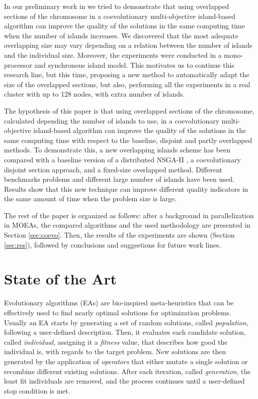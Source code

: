 \documentclass[preprint]{elsarticle}
\begin{document}
In our preliminary work in \citep{Garcia16hpmoon} we tried to demonstrate that using overlapped sections of the chromosome in a coevolutionary multi-objective island-based algorithm can improve the quality of the solutions in the same computing time when the number of islands increases. We discovered that the most adequate overlapping size may vary depending on a relation between the number of islands and the individual size. Moreover, the experiments were conducted in a mono-processor and synchronous island model. This motivates us to continue this research line, but this time, proposing a new method to automatically adapt the size of the overlapped sections, but also, performing all the experiments in a real cluster with up to 128 nodes, with extra number of islands.


The hypothesis of this paper is that using overlapped sections of the chromosome, calculated depending the number of islands to use, in a coevolutionary multi-objective island-based algorithm can improve the quality of the solutions in the same computing time with respect to the baseline, disjoint and partly overlapped methods. To demonstrate this, a new overlapping islands scheme has been compared with a baseline version of a distributed NSGA-II \citep{Deb00NSGAII}, a coevolutionary disjoint section approach, and a fixed-size overlapped method. Different benchmarks problems and different large number of islands have been used. Results show that this new technique can improve different quality indicators in the same amount of time when the problem size is large. 

The rest of the paper is organized as follows: after a background in parallelization in MOEAs, 
the compared algorithms and the used methodology are presented in Section \ref{sec:coevo}. %
Then, the results of the experiments are shown (Section \ref{sec:res}), followed by conclusions and suggestions for future work lines.


%
\section{State of the Art}
\label{sec:soa}

Evolutionary algorithms (EAs) \citep{DBLP:series/ncs/EibenS15,DeJong2006} are bio-inspired meta-heuristics that can be effectively used to find nearly optimal solutions for optimization problems. Usually an EA starts by generating a set of random solutions, called \emph{population}, following a user-defined description. Then, it evaluates each candidate solution, called \emph{individual}, assigning it a \emph{fitness} value, that describes how good the individual is, with regards to the target problem. New solutions are then generated by the application of \emph{operators} that either mutate a single solution or recombine different existing solutions. After each iteration, called \emph{generation}, the least fit individuals are removed, and the process continues until a user-defined stop condition is met.
\end{document}
